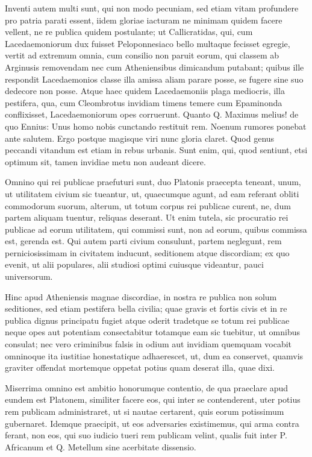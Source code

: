  Inventi autem multi sunt, qui non modo pecuniam, sed etiam vitam profundere pro patria parati essent, iidem gloriae iacturam ne minimam quidem facere vellent, ne re publica quidem postulante; ut Callicratidas, qui, cum Lacedaemoniorum dux fuisset Peloponnesiaco bello multaque fecisset egregie, vertit ad extremum omnia, cum consilio non paruit eorum, qui classem ab Arginusis removendam nec cum Atheniensibus dimicandum putabant; quibus ille respondit Lacedaemonios classe illa amissa aliam parare posse, se fugere sine suo dedecore non posse. Atque haec quidem Lacedaemoniis plaga mediocris, illa pestifera, qua, cum Cleombrotus invidiam timens temere cum Epaminonda conflixisset, Lacedaemoniorum opes corruerunt. Quanto Q. Maximus melius! de quo Ennius: Unus homo nobis cunctando restituit rem. Noenum rumores ponebat ante salutem. Ergo postque magisque viri nunc gloria claret. Quod genus peccandi vitandum est etiam in rebus urbanis. Sunt enim, qui, quod sentiunt, etsi optimum sit, tamen invidiae metu non audeant dicere.

 Omnino qui rei publicae praefuturi sunt, duo Platonis praecepta teneant, unum, ut utilitatem civium sic tueantur, ut, quaecumque agunt, ad eam referant obliti commodorum suorum, alterum, ut totum corpus rei publicae curent, ne, dum partem aliquam tuentur, reliquas deserant. Ut enim tutela, sic procuratio rei publicae ad eorum utilitatem, qui commissi sunt, non ad eorum, quibus commissa est, gerenda est. Qui autem parti civium consulunt, partem neglegunt, rem perniciosissimam in civitatem inducunt, seditionem atque discordiam; ex quo evenit, ut alii populares, alii studiosi optimi cuiusque videantur, pauci universorum.

 Hinc apud Atheniensis magnae discordiae, in nostra re publica non solum seditiones, sed etiam pestifera bella civilia; quae gravis et fortis civis et in re publica dignus principatu fugiet atque oderit tradetque se totum rei publicae neque opes aut potentiam consectabitur totamque eam sic tuebitur, ut omnibus consulat; nec vero criminibus falsis in odium aut invidiam quemquam vocabit omninoque ita iustitiae honestatique adhaerescet, ut, dum ea conservet, quamvis graviter offendat mortemque oppetat potius quam deserat illa, quae dixi.

 Miserrima omnino est ambitio honorumque contentio, de qua praeclare apud eundem est Platonem, similiter facere eos, qui inter se contenderent, uter potius rem publicam administraret, ut si nautae certarent, quis eorum potissimum gubernaret. Idemque praecipit, ut eos adversaries existimemus, qui arma contra ferant, non eos, qui suo iudicio tueri rem publicam velint, qualis fuit inter P. Africanum et Q. Metellum sine acerbitate dissensio.

